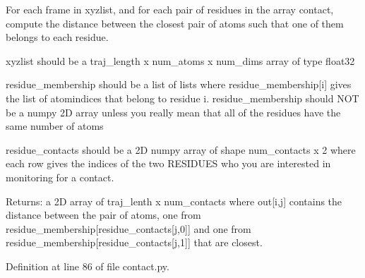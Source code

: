 For each frame in xyzlist, and for each pair of residues in the array contact, compute the distance between the closest pair of atoms such that one of them belongs to each residue. 

xyzlist should be a traj\-\_\-length x num\-\_\-atoms x num\-\_\-dims array of type float32

residue\-\_\-membership should be a list of lists where residue\-\_\-membership\mbox{[}i\mbox{]} gives the list of atomindices that belong to residue i. residue\-\_\-membership should N\-O\-T be a numpy 2\-D array unless you really mean that all of the residues have the same number of atoms

residue\-\_\-contacts should be a 2\-D numpy array of shape num\-\_\-contacts x 2 where each row gives the indices of the two R\-E\-S\-I\-D\-U\-E\-S who you are interested in monitoring for a contact.

Returns\-: a 2\-D array of traj\-\_\-lenth x num\-\_\-contacts where out\mbox{[}i,j\mbox{]} contains the distance between the pair of atoms, one from residue\-\_\-membership\mbox{[}residue\-\_\-contacts\mbox{[}j,0\mbox{]}\mbox{]} and one from residue\-\_\-membership\mbox{[}residue\-\_\-contacts\mbox{[}j,1\mbox{]}\mbox{]} that are closest. 

Definition at line 86 of file contact.\-py.

